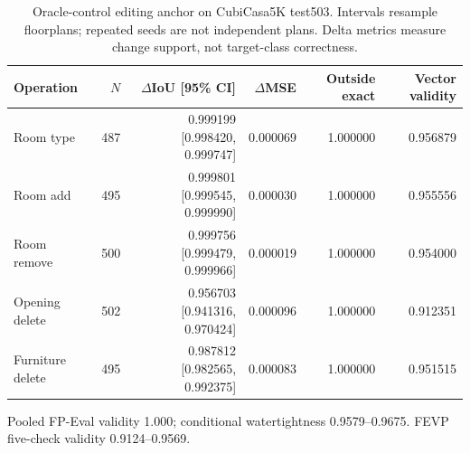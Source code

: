\begin{table}[t]
\centering
\caption{Oracle-control editing anchor on CubiCasa5K test503. Intervals resample floorplans; repeated seeds are not independent plans. Delta metrics measure change support, not target-class correctness.}
\label{tab:oracle}
\small
\begin{tabular}{lrrrrr}
\toprule
Operation & $N$ & $\Delta$IoU [95\% CI] & $\Delta$MSE & Outside exact & Vector validity \\
\midrule
Room type & 487 & 0.999199 [0.998420, 0.999747] & 0.000069 & 1.000000 & 0.956879 \\
Room add & 495 & 0.999801 [0.999545, 0.999990] & 0.000030 & 1.000000 & 0.955556 \\
Room remove & 500 & 0.999756 [0.999479, 0.999966] & 0.000019 & 1.000000 & 0.954000 \\
Opening delete & 502 & 0.956703 [0.941316, 0.970424] & 0.000096 & 1.000000 & 0.912351 \\
Furniture delete & 495 & 0.987812 [0.982565, 0.992375] & 0.000083 & 1.000000 & 0.951515 \\
\bottomrule
\end{tabular}
\par\smallskip\footnotesize Pooled FP-Eval validity 1.000; conditional watertightness 0.9579--0.9675. FEVP five-check validity 0.9124--0.9569.
\end{table}
